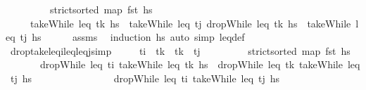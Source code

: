 \begin{isabellebody}
\ \ \ \ \ \ \ \ \ {\isachardoublequoteopen}strict{\isacharunderscore}{\kern0pt}sorted\ {\isacharparenleft}{\kern0pt}map\ fst\ hs{\isacharparenright}{\kern0pt}{\isachardoublequoteclose}\isanewline
\ \ \ \ \ {\isachardoublequoteopen}takeWhile\ {\isacharparenleft}{\kern0pt}leq\ t\isactrlsub k{\isacharparenright}{\kern0pt}\ hs\ {\isacharat}{\kern0pt}\ takeWhile\ {\isacharparenleft}{\kern0pt}leq\ t\isactrlsub j{\isacharparenright}{\kern0pt}\ {\isacharparenleft}{\kern0pt}dropWhile\ {\isacharparenleft}{\kern0pt}leq\ t\isactrlsub k{\isacharparenright}{\kern0pt}\ hs{\isacharparenright}{\kern0pt}\ {\isacharequal}{\kern0pt}\ takeWhile\ {\isacharparenleft}{\kern0pt}leq\ t\isactrlsub j{\isacharparenright}{\kern0pt}\ hs{\isachardoublequoteclose}\isanewline
%
\isadelimproof
\ \ \ \ %
\endisadelimproof
%
\isatagproof
{}\isamarkupfalse%
\ assms\ \isamarkupfalse%
\ {\isacharparenleft}{\kern0pt}induction\ hs{\isacharparenright}{\kern0pt}\ {\isacharparenleft}{\kern0pt}auto\ simp{\isacharcolon}{\kern0pt}\ leq{\isacharunderscore}{\kern0pt}def{\isacharparenright}{\kern0pt}%
\endisatagproof
{\isafoldproof}%
%
\isadelimproof
\isanewline
%
\endisadelimproof
\isanewline
\ \ \isamarkupfalse%
\ drop{\isacharunderscore}{\kern0pt}take{\isacharunderscore}{\kern0pt}leq\isactrlsub i{\isacharunderscore}{\kern0pt}leq{\isacharunderscore}{\kern0pt}leq\isactrlsub j{\isacharunderscore}{\kern0pt}simp{\isacharcolon}{\kern0pt}\isanewline
\ \ \ \ \ {\isachardoublequoteopen}t\isactrlsub i\ {\isasymle}\ t\isactrlsub k{\isachardoublequoteclose}\ \ {\isachardoublequoteopen}t\isactrlsub k\ {\isasymle}\ t\isactrlsub j{\isachardoublequoteclose}\isanewline
\ \ \ \ \ \ \ \ \ {\isachardoublequoteopen}strict{\isacharunderscore}{\kern0pt}sorted\ {\isacharparenleft}{\kern0pt}map\ fst\ hs{\isacharparenright}{\kern0pt}{\isachardoublequoteclose}\isanewline
\ \ \ \ \ \ \ {\isachardoublequoteopen}dropWhile\ {\isacharparenleft}{\kern0pt}leq\ t\isactrlsub i{\isacharparenright}{\kern0pt}\ {\isacharparenleft}{\kern0pt}takeWhile\ {\isacharparenleft}{\kern0pt}leq\ t\isactrlsub k{\isacharparenright}{\kern0pt}\ hs{\isacharparenright}{\kern0pt}\ {\isacharat}{\kern0pt}\ dropWhile\ {\isacharparenleft}{\kern0pt}leq\ t\isactrlsub k{\isacharparenright}{\kern0pt}\ {\isacharparenleft}{\kern0pt}takeWhile\ {\isacharparenleft}{\kern0pt}leq\ t\isactrlsub j{\isacharparenright}{\kern0pt}\ hs{\isacharparenright}{\kern0pt}\ \isanewline
\ \ \ \ \ \ \ \ \ \ \ \ \ \ {\isacharequal}{\kern0pt}\ dropWhile\ {\isacharparenleft}{\kern0pt}leq\ t\isactrlsub i{\isacharparenright}{\kern0pt}\ {\isacharparenleft}{\kern0pt}takeWhile\ {\isacharparenleft}{\kern0pt}leq\ t\isactrlsub j{\isacharparenright}{\kern0pt}\ hs{\isacharparenright}{\kern0pt}{\isachardoublequoteclose}\isanewline

\end{isabellebody}
